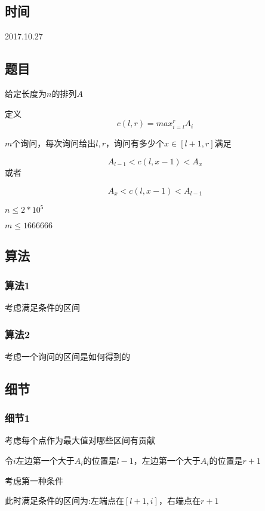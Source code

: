 \documentclass[a4paper]{article}
\begin{document}
	\subsection{时间}
		
		2017.10.27
		
	\subsection{题目}
		
		给定长度为$n$的排列$A$
		
		定义$$c(l, r) = max_{i = l}^r A_i$$
		
		$m$个询问，每次询问给出$l,r$，询问有多少个$x\in [l + 1, r]$满足
		
		$$A_{l - 1} < c(l, x - 1) < A_x$$或者
		
		$$A_x < c(l, x - 1) < A_{l - 1}$$
		
		
		$n \leq 2 * 10^5$
		
		$m \leq 1666666$
		
	\subsection{算法}
		
		\subsubsection{算法1}
			
			考虑满足条件的区间
			
		\subsubsection{算法2}
			
			考虑一个询问的区间是如何得到的
			
	\subsection{细节}
		
		\subsubsection{细节1}
			
			考虑每个点作为最大值对哪些区间有贡献
			
			令$i$左边第一个大于$A_i$的位置是$l - 1$，左边第一个大于$A_i$的位置是$r + 1$
			
			考虑第一种条件
			
			此时满足条件的区间为:左端点在$[l + 1,i]$，右端点在$r + 1$
			
\end{document}

